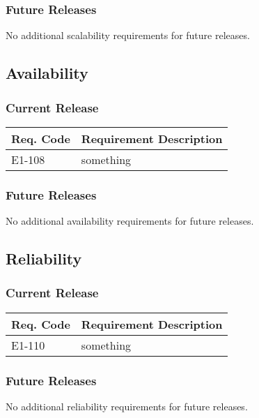 \documentclass[12pt]{article}
\begin{document}
\subsubsection{Future Releases}
No additional scalability requirements for future releases.


\subsection{Availability}

\subsubsection{Current Release}

\begin{table}[!h]
	\begin{tabular}{| l | l |}
		\hline
		\textbf{Req. Code} & \textbf{Requirement Description}\\
		\hline
		E1-108	& something\\
		\hline
	\end{tabular}
	\label{tab:AvailabilityRequirements}
\end{table}

\subsubsection{Future Releases}
No additional availability requirements for future releases.


\subsection{Reliability}

\subsubsection{Current Release}

\begin{table}[!h]
	\begin{tabular}{| l | l|}
		\hline
		\textbf{Req. Code} & \textbf{Requirement Description}\\
		\hline
		E1-110	& something\\
		\hline
	\end{tabular}
	\label{tab:ReliabilityRequirements}
\end{table}

\subsubsection{Future Releases}
No additional reliability requirements for future releases.
\end{document}

